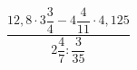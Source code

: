 \begin{ex}[type=calculate]
	\begin{condition}
		\( \dfrac{12,8\cdot3\dfrac{3}{4}-4\dfrac{4}{11}\cdot4,125}{2\dfrac{4}{7}:\dfrac{3}{35}} \)
	\end{condition}
\end{ex}